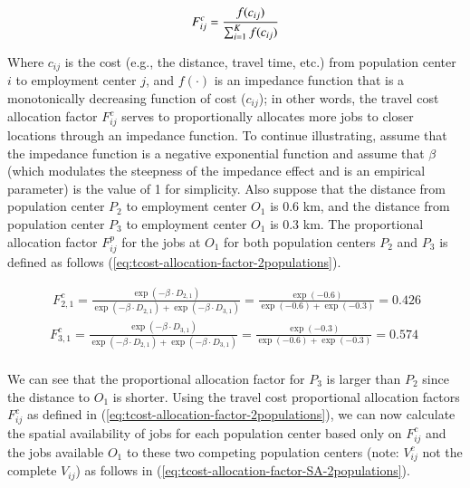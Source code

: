 \documentclass[]{elsarticle} %
\begin{document}
\begin{equation}
\label{eq:tcost-alloc-factor}
F^c_{ij} = \frac{f(c_{ij})}{\sum_{i=1}^K f(c_{ij})}\\
\end{equation}

Where \(c_{ij}\) is the cost (e.g., the distance, travel time, etc.)
from population center \(i\) to employment center \(j\), and
\(f(\cdot)\) is an impedance function that is a monotonically decreasing
function of cost (\(c_{ij}\)); in other words, the travel cost
allocation factor \(F^c_{ij}\) serves to proportionally allocates more
jobs to closer locations through an impedance function. To continue
illustrating, assume that the impedance function is a negative
exponential function and assume that \(\beta\) (which modulates the
steepness of the impedance effect and is an empirical parameter) is the
value of 1 for simplicity. Also suppose that the distance from
population center \(P_2\) to employment center \(O_1\) is 0.6 km, and
the distance from population center \(P_3\) to employment center \(O_1\)
is 0.3 km. The proportional allocation factor \(F^p_{ij}\) for the jobs
at \(O_1\) for both population centers \(P_2\) and \(P_3\) is defined as
follows (\ref{eq:tcost-allocation-factor-2populations}).

\begin{equation}
\label{eq:tcost-allocation-factor-2populations}
\begin{array}{l}\
F^c_{2,1} = \frac{\exp(-\beta \cdot D_{2,1})}{\exp(-\beta \cdot D_{2,1}) + \exp(-\beta \cdot D_{3,1})} = \frac{\exp(-0.6)}{\exp(-0.6) + \exp(-0.3)} = 0.426\\
F^c_{3,1} = \frac{\exp(-\beta \cdot D_{3,1})}{\exp(-\beta \cdot D_{2,1}) + \exp(-\beta \cdot D_{3,1})}  = \frac{\exp(-0.3)}{\exp(-0.6) + \exp(-0.3)} = 0.574\\
\end{array}
\end{equation}

We can see that the proportional allocation factor for \(P_3\) is larger
than \(P_2\) since the distance to \(O_1\) is shorter. Using the travel
cost proportional allocation factors \(F^c_{ij}\) as defined in
(\ref{eq:tcost-allocation-factor-2populations}), we can now calculate
the spatial availability of jobs for each population center based only
on \(F^c_{ij}\) and the jobs available \(O_1\) to these two competing
population centers (note: \(V^c_{ij}\) not the complete \(V_{ij}\)) as
follows in (\ref{eq:tcost-allocation-factor-SA-2populations}).
\end{document}
